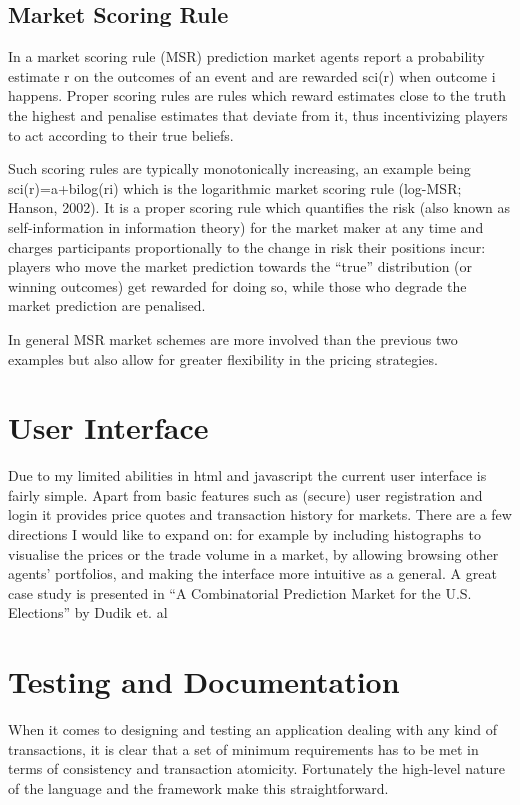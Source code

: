 \documentclass[bsc,frontabs,twoside,singlespacing,parskip,deptreport]{infthesis}     %
\begin{document}
\subsection{Market Scoring Rule}
In a market scoring rule (MSR) prediction market agents report a probability estimate r on the outcomes of an event and are rewarded sci(r) when outcome i happens. Proper scoring rules are rules which reward estimates close to the truth the highest and penalise estimates that deviate from it, thus incentivizing players to act according to their true beliefs.

 Such scoring rules are typically monotonically increasing, an example being sci(r)=a+bilog(ri) which is the logarithmic market scoring rule (log-MSR; Hanson, 2002). It is a proper scoring rule which quantifies the risk (also known as self-information in information theory) for the market maker at any time and charges participants proportionally to the change in risk their positions incur: players who move the market prediction towards the “true” distribution (or winning outcomes) get rewarded for doing so, while those who degrade the market prediction are penalised.

In general MSR market schemes are more involved than the previous two examples but also allow for greater flexibility in the pricing strategies. 

\section{User Interface}

	Due to my limited abilities in html and javascript the current user interface is fairly simple. Apart from basic features such as (secure) user registration and login it provides price quotes and transaction history for markets. There are a few directions I would like to expand on: for example by including histographs to visualise the prices or the trade volume in a market, by allowing browsing other agents’ portfolios, and making the interface more intuitive as a general. A great case study is presented in “A Combinatorial Prediction Market for the U.S. Elections” by Dudik et. al

\section{Testing and Documentation}
	When it comes to designing and testing an application dealing with any kind of transactions, it is clear that a set of minimum requirements has to be met in terms of consistency and transaction atomicity. Fortunately the high-level nature of the language and the framework make this straightforward. 
\end{document}

